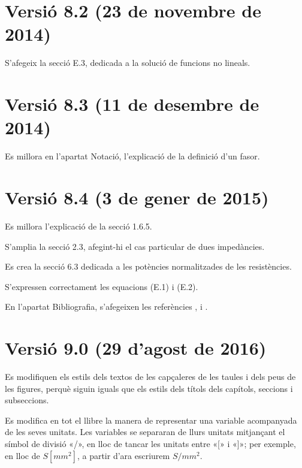 \section*{Versió 8.2 (23 de novembre de 2014)}

S'afegeix la secció E.3, dedicada a la solució de funcions no lineals.

\section*{Versió 8.3 (11 de desembre de 2014)}

Es millora en l'apartat Notació, l'explicació de la definició d'un fasor.


\section*{Versió 8.4 (3 de gener de 2015)}

Es millora l'explicació de la secció 1.6.5.

S'amplia la secció 2.3, afegint-hi el cas particular de dues impedàncies.

Es crea la secció 6.3 dedicada a les potències normalitzades de les resistències.

S'expressen correctament les equacions (E.1) i (E.2).

En l'apartat Bibliografia, s'afegeixen les referències \cite{AGVS}, \cite{JSch} i \cite{RRop}.


\section*{Versió 9.0 (29 d’agost de 2016)}

Es modifiquen els estils dels textos de les capçaleres de les taules i dels peus de les figures, perquè siguin iguals que els estils dels títols dels capítols, seccions i subseccions.

Es modifica en tot el llibre la manera de representar una variable acompanyada de les seves unitats. Les variables se separaran de llurs unitats mitjançant el símbol de divisió «/», en lloc de tancar les unitats entre «[» i  «]»; per exemple, en lloc de $S\unit{[mm^2]}$, a partir d'ara escriurem $S/\unit{mm^2}$.

